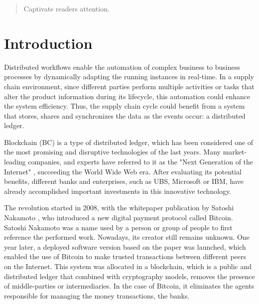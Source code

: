 \begin{abstract}
Captivate readers attention.
\end{abstract}




\chapter{Introduction}

Distributed workflows enable the automation of complex business to business processes by dynamically adapting the running instances in real-time. In a supply chain environment, since different parties perform multiple activities or tasks that alter the product information during its lifecycle, this automation could enhance the system efficiency. Thus, the supply chain cycle could benefit from a system that stores, shares and synchronizes the data as the events occur: a distributed ledger.

Blockchain (BC) is a type of distributed ledger, which has been considered one of the most promising and disruptive technologies of the last years. Many market-leading companies, and experts have referred to it as the "Next Generation of the Internet" \cite{JenClarck2017}, succeeding the World Wide Web era. After evaluating its potential benefits, different banks and enterprises, such as UBS, Microsoft or IBM, have already accomplished important investments in this innovative technology.

The revolution started in 2008, with the whitepaper publication by Satoshi Nakamoto \cite{nakamoto2008bitcoin}, who introduced a new digital payment protocol called Bitcoin. Satoshi Nakamoto was a name used by a person or group of people to first reference the performed work. Nowadays, its creator still remains unknown. One year later, a deployed software version based on the paper was launched, which enabled the use of Bitcoin to make trusted transactions between different peers on the Internet. This system was allocated in a blockchain, which is a public and distributed ledger that combined with cryptography models, removes the presence of middle-parties or intermediaries. In the case of Bitcoin, it eliminates the agents responsible for managing the money transactions, the banks.

